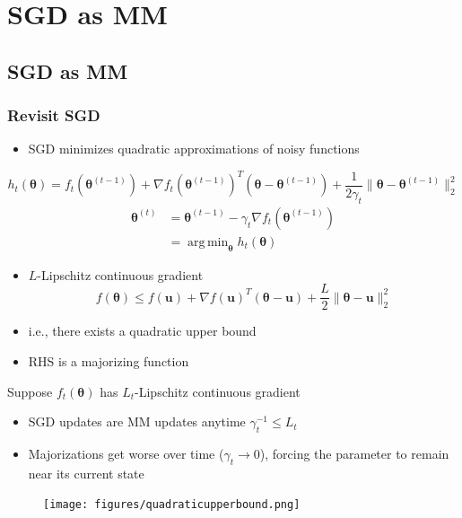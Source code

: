 \documentclass{beamer}
\newcommand{\iter}[2]{#1^{(#2)}}
\DeclareMathOperator*{\argmin}{arg\,min}
\begin{document}
\section{SGD as MM}

\subsection{SGD as MM}

\begin{frame}
  \frametitle{Revisit SGD}
  \begin{itemize}
    \item SGD minimizes quadratic approximations of noisy functions
  \end{itemize}
  $$h_t(\bm\theta) = f_t(\iter{\bm\theta}{t-1}) + \nabla f_t(\iter{\bm\theta}{t-1})^T(\bm\theta - \iter{\bm\theta}{t-1}) + \frac{1}{2\gamma_t}\|\bm\theta - \iter{\bm\theta}{t-1}\|_2^2$$
  \vspace{5mm}
  $$\begin{aligned}\iter{\bm\theta}{t} &= \iter{\bm\theta}{t-1} - \gamma_t \nabla f_t(\iter{\bm\theta}{t-1}) \\ &= \argmin_{\bm\theta} h_t(\bm\theta)\end{aligned}$$

\end{frame}
\begin{frame}
  \begin{itemize}
    \item $L$-Lipschitz continuous gradient
    $$f(\bm\theta) \le f(\bm u) + \nabla f(\bm u)^T(\bm\theta - \bm u) + \frac{L}{2}\|\bm\theta - \bm u\|_2^2$$
    \item i.e., there exists a quadratic upper bound
    \item RHS is a majorizing function
  \end{itemize}
\end{frame}
\begin{frame}
  Suppose $f_t(\bm\theta)$ has $L_t$-Lipschitz continuous gradient
  \begin{itemize}
    \item SGD updates are MM updates anytime $\gamma_t^{-1} \le L_t$
  \end{itemize}
\end{frame}
\begin{frame}
  \begin{itemize}
    \item Majorizations get worse over time ($\gamma_t \rightarrow 0$), forcing the parameter to remain near its current state
  \end{itemize}
  \begin{figure}
    \texttt{[image: figures/quadraticupperbound.png]}
  \end{figure}
\end{frame}
\end{document}
